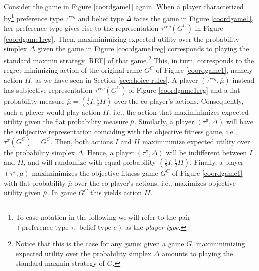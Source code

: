 \documentclass[fleqn,reqno,11pt]{article}
\begin{document}
\begin{example}
  Consider the game in Figure \ref{coordgame1} again. When a player characterized
  by\footnote{To ease notation in the following we will refer to the pair
    $(\text{preference type } \tau,\text{ belief type } e)$ as the \textit{player type}.} preference
  type $ \tau^{reg} $ and belief type $ \Delta $ faces the game in Figure
  \ref{coordgame1}, her preference type gives rise to the representation $\tau^{reg}(G^C)$ in
  Figure \ref{coordgame1reg}. Then, maximinimizing expected utility over the probability
  simplex $ \Delta $ given the game in Figure \ref{coordgame1reg} corresponds to
  playing the standard maxmin strategy [REF] of that game.\footnote{Notice that this is the
    case for any game: given a game $G$, maximinimizing expected utility over the probability
    simplex $ \Delta $ amounts to playing the standard maxmin strategy of $G$.} This,
  in turn, corresponds to the regret minimizing action of the original game $G^C$ of Figure
  \ref{coordgame1}, namely action $II$, as we have seen in Section \ref{sec:choice-rules}. A
  player $(\tau^{reg},\overline{\mu})$ instead has subjective representation $\tau^{reg}(G^C)$
  of Figure \ref{coordgame1reg} and a flat probability measure
  $\overline{\mu}=(\frac{1}{2}I,\frac{1}{2}II)$ over the co-player's actions. Consequently,
  such a player would play action $II$, i.e., the action that maximinimizes expected utility
  given the flat probability measure $\overline{\mu}$. Similarly, a player
  $(\tau^{\pi},\Delta)$ will have the subjective representation coinciding with the
  objective fitness game, i.e., $ \tau^{\pi}(G^C)= G^C $. Then, both actions $I$ and $II$
  maximinimize expected utility over the probability simplex $ \Delta $. Hence, a
  player $(\tau^{\pi},\Delta)$ will be indifferent between $I$ and $II$, and will
  randomize with equal probability $(\frac{1}{2}I,\frac{1}{2}II)$. Finally, a player
  $(\tau^{\pi},\overline{\mu})$ maximinimizes the objective fitness game $G^C$ of Figure
  \ref{coordgame1} with flat probability $\overline{\mu}$ over the co-player's actions, i.e.,
  maximizes objective utility given $\overline{\mu}$. In game $G^C$ this yields action $II$.

\end{example}


\end{document}
